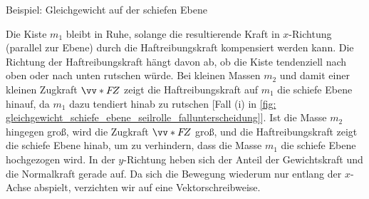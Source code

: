 \begin{examplebox}[lower separated=true, breakable]{Beispiel: Gleichgewicht auf der schiefen Ebene}
\begin{center}
{%
    }
    \label{fig: gleichgewicht_schiefe_ebene_seilrolle_fallunterscheidung}
\end{center}
Die Kiste $m_1$ bleibt in Ruhe, solange die resultierende Kraft in $x$-Richtung (parallel zur Ebene) durch die Haftreibungskraft kompensiert werden kann. Die Richtung der Haftreibungskraft hängt davon ab, ob die Kiste tendenziell nach oben oder nach unten rutschen würde. Bei kleinen Massen $m_2$ und damit einer kleinen Zugkraft $\ivecS{F}{Z}$ zeigt die Haftreibungskraft auf $m_1$ die schiefe Ebene hinauf, da $m_1$ dazu tendiert hinab zu rutschen [Fall (i) in \cref{fig: gleichgewicht_schiefe_ebene_seilrolle_fallunterscheidung}]. Ist die Masse $m_2$ hingegen groß, wird die Zugkraft $\ivecS{F}{Z}$ groß, und die Haftreibungskraft zeigt die schiefe Ebene hinab, um zu verhindern, dass die Masse $m_1$ die schiefe Ebene hochgezogen wird.\newline
In der $y$-Richtung heben sich der Anteil der Gewichtskraft und die Normalkraft gerade auf. Da sich die Bewegung wiederum nur entlang der $x$-Achse abspielt, verzichten wir auf eine Vektorschreibweise.


\end{examplebox}
